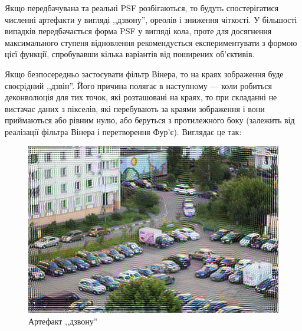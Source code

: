 \documentclass{diploma}
\begin{document}
    Якщо передбачувана та реальні PSF розбігаються, то будуть спостерігатися
    численні артефакти у вигляді ,,дзвону'', ореолів і зниження чіткості.
    У більшості випадків передбачається форма PSF у вигляді кола, проте для
    досягнення максимального ступеня відновлення рекомендується
    експериментувати з формою цієї функції, спробувавши кілька варіантів від
    поширених об’єктивів.

    Якщо безпосередньо застосувати фільтр Вінера, то на краях зображення буде
    своєрідний ,,дзвін''.
    Його причина полягає в наступному --- коли робиться деконволюція для тих
    точок, які розташовані на краях, то при складанні не вистачає даних з
    пікселів, які перебувають за краями зображення і вони приймаються або
    рівним нулю, або беруться з протилежного боку (залежить від реалізації
    фільтра Вінера і перетворення Фур’є). Виглядає це так:
    \begin{figure}[h]
      \centering
      \includegraphics[width=\linewidth]{edge-artifact.jpg}
      \caption{Артефакт ,,дзвону''}
      \label{fig:edge-artifact}
    \end{figure}
\end{document}
